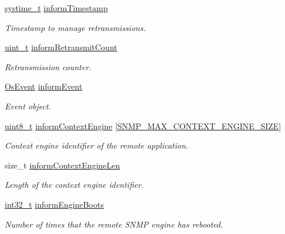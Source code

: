 \begin{DoxyCompactItemize}
\hyperlink{compiler__port_8h_ae3e32a98d431a02106616da3071832dd}{systime\+\_\+t} \hyperlink{struct__SnmpAgentContext_ac72e1c8aec25701b351522f18d985a0d}{inform\+Timestamp}
\begin{DoxyCompactList}\small\item\em Timestamp to manage retransmissions. \end{DoxyCompactList}\item 
\hyperlink{compiler__port_8h_a12a1e9b3ce141648783a82445d02b58d}{uint\+\_\+t} \hyperlink{struct__SnmpAgentContext_a70dfba9cd1231b201dc3e490368e9f1d}{inform\+Retransmit\+Count}
\begin{DoxyCompactList}\small\item\em Retransmission counter. \end{DoxyCompactList}\item 
\hyperlink{structOsEvent}{Os\+Event} \hyperlink{struct__SnmpAgentContext_a23982cb4b1051f03662373c45dfb830e}{inform\+Event}
\begin{DoxyCompactList}\small\item\em Event object. \end{DoxyCompactList}\item 
\hyperlink{stdint_8h_aba7bc1797add20fe3efdf37ced1182c5}{uint8\+\_\+t} \hyperlink{struct__SnmpAgentContext_a2c656a5f4fa44f8f617de8dcbaa3e322}{inform\+Context\+Engine} \mbox{[}\hyperlink{snmp__common_8h_a182f7381f1e0c29ee196042008e380be}{S\+N\+M\+P\+\_\+\+M\+A\+X\+\_\+\+C\+O\+N\+T\+E\+X\+T\+\_\+\+E\+N\+G\+I\+N\+E\+\_\+\+S\+I\+ZE}\mbox{]}
\begin{DoxyCompactList}\small\item\em Context engine identifier of the remote application. \end{DoxyCompactList}\item 
size\+\_\+t \hyperlink{struct__SnmpAgentContext_ad337880b411ff4a9cf9e194f003ca3cf}{inform\+Context\+Engine\+Len}
\begin{DoxyCompactList}\small\item\em Length of the context engine identifier. \end{DoxyCompactList}\item 
\hyperlink{stdint_8h_ab1967d8591af1a4e48c37fd2b0f184d0}{int32\+\_\+t} \hyperlink{struct__SnmpAgentContext_af3dbc1c2b661944074c7581104238eae}{inform\+Engine\+Boots}
\begin{DoxyCompactList}\small\item\em Number of times that the remote S\+N\+MP engine has rebooted. \end{DoxyCompactList}\item 

\end{DoxyCompactItemize}
